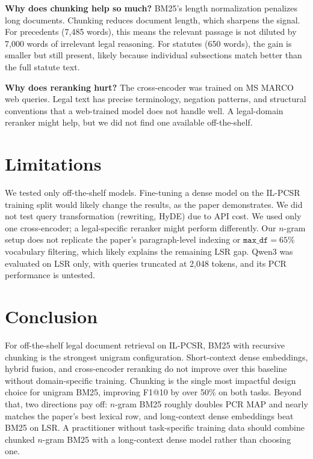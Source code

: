 \documentclass[11pt]{article}
\begin{document}
\textbf{Why does chunking help so much?} BM25's length normalization penalizes long documents. Chunking reduces document length, which sharpens the signal. For precedents (7{,}485 words), this means the relevant passage is not diluted by 7{,}000 words of irrelevant legal reasoning. For statutes (650 words), the gain is smaller but still present, likely because individual subsections match better than the full statute text.

\textbf{Why does reranking hurt?} The cross-encoder was trained on MS MARCO web queries. Legal text has precise terminology, negation patterns, and structural conventions that a web-trained model does not handle well. A legal-domain reranker might help, but we did not find one available off-the-shelf.

\section{Limitations}

We tested only off-the-shelf models. Fine-tuning a dense model on the IL-PCSR training split would likely change the results, as the paper demonstrates. We did not test query transformation (rewriting, HyDE) due to API cost. We used only one cross-encoder; a legal-specific reranker might perform differently. Our $n$-gram setup does not replicate the paper's paragraph-level indexing or $\texttt{max\_df}=65\%$ vocabulary filtering, which likely explains the remaining LSR gap. Qwen3 was evaluated on LSR only, with queries truncated at 2{,}048 tokens, and its PCR performance is untested.

\section{Conclusion}

For off-the-shelf legal document retrieval on IL-PCSR, BM25 with recursive chunking is the strongest unigram configuration. Short-context dense embeddings, hybrid fusion, and cross-encoder reranking do not improve over this baseline without domain-specific training. Chunking is the single most impactful design choice for unigram BM25, improving F1@10 by over 50\% on both tasks. Beyond that, two directions pay off: $n$-gram BM25 roughly doubles PCR MAP and nearly matches the paper's best lexical row, and long-context dense embeddings beat BM25 on LSR. A practitioner without task-specific training data should combine chunked $n$-gram BM25 with a long-context dense model rather than choosing one.
\end{document}
